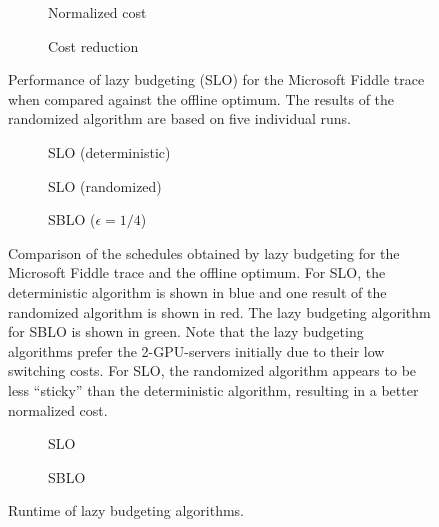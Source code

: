 \begin{figure}
    \begin{subfigure}[b]{.5\linewidth}
    \resizebox{\textwidth}{!}{}
    \caption{Normalized cost}\label{fig:case_studies:md:slo:normalized_cost}
    \end{subfigure}
    \begin{subfigure}[b]{.5\linewidth}
    \resizebox{\textwidth}{!}{}
    \caption{Cost reduction}\label{fig:case_studies:md:slo:cost_reduction}
    \end{subfigure}
    \caption{Performance of lazy budgeting (SLO) for the Microsoft Fiddle trace when compared against the offline optimum. The results of the randomized algorithm are based on five individual runs.}
\end{figure}

\begin{figure}
    \begin{subfigure}[b]{.3425\linewidth}
    \resizebox{\textwidth}{!}{}
    \caption{SLO (deterministic)}\label{fig:case_studies:md:slo:det:schedule}
    \end{subfigure}
    \begin{subfigure}[b]{.32\linewidth}
    \resizebox{\textwidth}{!}{}
    \caption{SLO (randomized)}\label{fig:case_studies:md:slo:rand:schedule}
    \end{subfigure}
    \begin{subfigure}[b]{.32\linewidth}
    \resizebox{\textwidth}{!}{}
    \caption{SBLO ($\epsilon = 1/4$)}\label{fig:case_studies:md:sblo:schedule}
    \end{subfigure}
    \caption{Comparison of the schedules obtained by lazy budgeting for the Microsoft Fiddle trace and the offline optimum. For SLO, the deterministic algorithm is shown in blue and one result of the randomized algorithm is shown in red. The lazy budgeting algorithm for SBLO is shown in green. Note that the lazy budgeting algorithms prefer the 2-GPU-servers initially due to their low switching costs. For SLO, the randomized algorithm appears to be less ``sticky'' than the deterministic algorithm, resulting in a better normalized cost.}
\end{figure}

\begin{figure}
    \begin{subfigure}[b]{.5175\linewidth}
    \resizebox{\textwidth}{!}{}
    \caption{SLO}\label{fig:case_studies:md:slo:runtimes}
    \end{subfigure}
    \begin{subfigure}[b]{.4825\linewidth}
    \resizebox{\textwidth}{!}{}
    \caption{SBLO}\label{fig:case_studies:md:sblo:runtimes}
    \end{subfigure}
    \caption{Runtime of lazy budgeting algorithms.}
\end{figure}

